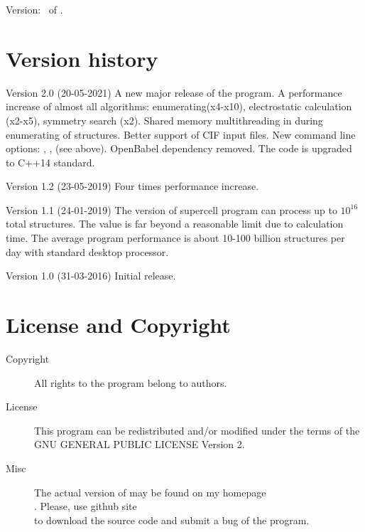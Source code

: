 \documentclass[a4paper,english]{article}
\begin{document}
Version: \Version\ of \Date.

\section{Version history}
\begin{Description}
  \item[Version 2.0 (20-05-2021)] A new major release of the program. A performance increase of almost all algorithms: enumerating(x4-x10), electrostatic calculation (x2-x5), symmetry search (x2). Shared memory multithreading in during enumerating of structures. Better support of CIF input files. New command line options: , , (see above). OpenBabel dependency removed. The code is upgraded to C++14 standard.
  \item[Version 1.2 (23-05-2019)] Four times performance increase.
  \item[Version 1.1 (24-01-2019)] The version of supercell program can process up to $10^{16}$ total structures. The value is far beyond a reasonable limit due to calculation time. The average program performance is about 10-100 billion structures per day with standard desktop processor. 
  \item[Version 1.0 (31-03-2016)] Initial release.
\end{Description}



\section{License and Copyright}

\begin{description}
\item[Copyright] 
     All rights to the program belong to authors.

\item[License] This program can be redistributed and/or modified under the
     terms of the GNU GENERAL PUBLIC LICENSE Version 2.

\item[Misc]
     The actual version of   may be found on my homepage\\
     . Please, use github site \\
     to download the source code and submit a bug of the program. 

\end{description}
\end{document}
